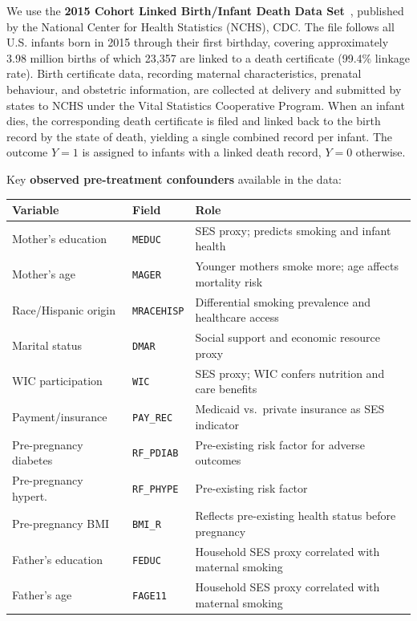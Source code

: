 \documentclass[11pt]{article}
\begin{document}
We use the \textbf{2015 Cohort Linked Birth/Infant Death Data Set}~\cite{nchs2015},
published by the National Center for Health Statistics (NCHS), CDC. The file
follows all U.S. infants born in 2015 through their first birthday,
covering approximately 3.98 million births of which 23,357 are linked to a
death certificate (99.4\% linkage rate). Birth certificate data, recording
maternal characteristics, prenatal behaviour, and obstetric information,
are collected at delivery and submitted by states to NCHS under the Vital
Statistics Cooperative Program. When an infant dies, the corresponding death
certificate is filed and linked back to the birth record by the state of
death, yielding a single combined record per infant. The outcome $Y=1$ is
assigned to infants with a linked death record, $Y=0$ otherwise.

Key \textbf{observed pre-treatment confounders} available in the data:

\begin{center}
\small
\begin{tabular}{lll}
\hline
\textbf{Variable} & \textbf{Field} & \textbf{Role} \\
\hline
Mother's education    & \texttt{MEDUC}                    & SES proxy; predicts smoking and infant health \\
Mother's age          & \texttt{MAGER}                    & Younger mothers smoke more; age affects mortality risk \\
Race/Hispanic origin  & \texttt{MRACEHISP}                & Differential smoking prevalence and healthcare access \\
Marital status        & \texttt{DMAR}                     & Social support and economic resource proxy \\
WIC participation     & \texttt{WIC}                      & SES proxy; WIC confers nutrition and care benefits \\
Payment/insurance     & \texttt{PAY\_REC}                 & Medicaid vs.\ private insurance as SES indicator \\
Pre-pregnancy diabetes& \texttt{RF\_PDIAB}                & Pre-existing risk factor for adverse outcomes \\
Pre-pregnancy hypert. & \texttt{RF\_PHYPE}                & Pre-existing risk factor \\
Pre-pregnancy BMI     & \texttt{BMI\_R}                   & Reflects pre-existing health status before pregnancy \\
Father's education    & \texttt{FEDUC}                    & Household SES proxy correlated with maternal smoking \\
Father's age          & \texttt{FAGE11}                   & Household SES proxy correlated with maternal smoking \\
\hline
\end{tabular}
\end{center}
\end{document}
